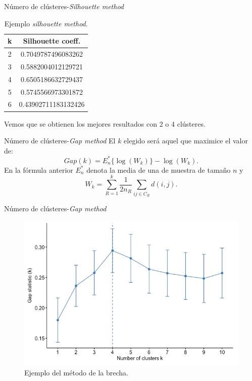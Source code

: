 \documentclass[spanish]{beamer}
\begin{document}
\begin{frame}{Número de clústeres-\textit{Silhouette method}}
	\begin{table}[h!]
		\centering
		\begin{tabular}{cc} 
			\hline
			k & Silhouette coeff. \\
			\hline
			2 &  0.7049787496083262 \\			 
			3 & 0.5882004012129721 \\	
			4 &  0.6505186632729437 \\
			5 &  0.5745566973301872 \\
			6 & 0.43902711183132426 \\
			\hline
		\end{tabular}
		\caption{Ejemplo \textit{silhouette method}.}
	\end{table}
	Vemos que se obtienen los mejores resultados con 2 o 4 clústeres.
\end{frame}

\begin{frame}{Número de clústeres-\textit{Gap method}}
	El $ k $ elegido será aquel que maximice el valor de:
	\[
	Gap(k) = E^*_n\{ \log(W_k)\} - \log(W_k).
	\]
	En la fórmula anterior $ E^*_n $ denota la media de una de muestra de tamaño $ n $ y 
	\[
	W_k = \sum_{R = 1}^{k}\frac{1}{2 n_R}\sum_{i j \in C_R} d(i,j).
	\]
\end{frame}

\begin{frame}{Número de clústeres-\textit{Gap method}}
	\begin{figure}[H]
		\centering
		\includegraphics[scale=0.32]{pedro/gapGraph}
		\caption{Ejemplo del método de la brecha.}
	\end{figure}
\end{frame}
\end{document}
